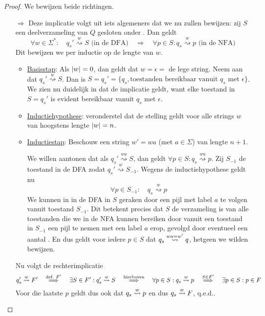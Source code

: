 \documentclass[../aanvullingen_cursus.tex]{subfiles}
\begin{document}
\begin{proof}
	We bewijzen beide richtingen.
	\begin{enumerate}
		\item[\( \Rightarrow \)] Deze implicatie volgt uit iets algemeners dat we nu zullen bewijzen: zij \(S\) een deelverzameling van \( Q \) gesloten onder \epsilonbogen. Dan geldt \[ \forall w \in \Sigma^*: \quad q_{s}' \overset{w}{\rightsquigarrow} S \text{ (in de DFA)} \quad \Longrightarrow \quad \forall p \in S: q_s \overset{w}{\rightsquigarrow} p \text{ (in de NFA)}  \] Dit bewijzen we per inductie op de lengte van \( w \).
		\begin{itemize}
			\item \underline{Basisstap}: Als \(\lvert w \rvert=0\), dan geldt dat \(w = \epsilon = \) de lege string. Neem aan dat \(q_{s}' \overset{w}{\rightsquigarrow} S\). Dan is \(S=q_s'=\{q_s, \text{toestanden bereikbaar vanuit }q_s \text{ met }\epsilon\}\). We zien nu duidelijk in dat de implicatie geldt, want elke toestand in \(S=q_s'\) is evident bereikbaar vanuit \(q_s\) met \(\epsilon\).
			\item \underline{Inductiehypothese}: veronderstel dat de stelling geldt voor alle strings \(w\) van hoogstens lengte \(\lvert w \rvert=n\).
			\item \underline{Inductiestap}: Beschouw een string \(w' = wa \) (met \(a \in \Sigma\)) van lengte \(n+1\).

			We willen aantonen dat als \(q_{s}' \overset{wa}{\rightsquigarrow} S\), dan geldt \(\forall p \in S: q_s \overset{wa}{\rightsquigarrow} p\). Zij \(S_{-1}\) de toestand in de DFA zodat \(q_{s}' \overset{w}{\rightsquigarrow} S_{-1}\). Wegens de inductiehypothese geldt nu \[ \forall p\in S_{-1}: \quad q_s \overset{w}{\rightsquigarrow} p\]We kunnen in in de DFA in \(S\) geraken door een pijl met label \(a\) te volgen vanuit toestand \(S_{-1}\). Dit betekent precies dat \(S\) de verzameling is van alle toestanden die we in de NFA kunnen bereiken door vanuit een toestand in \(S_{-1}\) een pijl te nemen met een label \(a\) erop, gevolgd door eventueel een aantal \epsilonbogen. En dus geldt voor iedere \(p \in S\) dat \(q_s \overset{wa=w'}{\rightsquigarrow} q \), hetgeen we wilden bewijzen.
		\end{itemize}

		Nu volgt de rechterimplicatie \[q_s'\overset{w}{\rightsquigarrow}F' \quad \overset{\text{def. }F'}{\Longrightarrow} \quad \exists S \in F': q_s' \overset{w}{\rightsquigarrow} S \quad \overset{\text{hierboven}}{\Longrightarrow} \quad \forall p \in S: q_s \overset{w}{\rightsquigarrow} p \quad \overset{S \in F'}{\Longrightarrow} \quad \exists p \in S : p \in F\] Voor die laatste \(p\) geldt dus ook dat \(q_s \overset{w}{\rightsquigarrow} p\) en dus \(q_s \overset{w}{\rightsquigarrow} F\), q.e.d..


\end{enumerate}
\end{proof}
\end{document}
